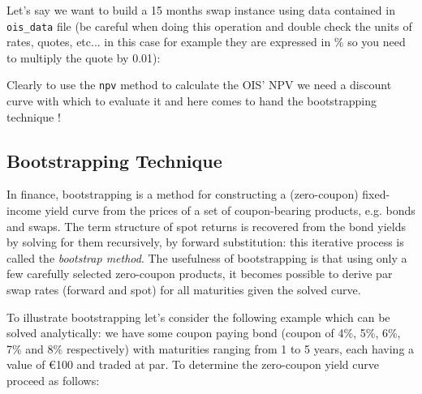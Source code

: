 Let's say we want to build a 15 months swap instance using data contained in \texttt{ois\_data} file (be careful when doing this operation and double check the units of rates, quotes, etc... in this case for example they are expressed in \% so you need to multiply the quote by 0.01):

\begin{Shaded}
\begin{Highlighting}[]
\OperatorTok{=}\NormalTok{,}
\NormalTok{                         [date(}\NormalTok{, }\NormalTok{, }\NormalTok{), }
\NormalTok{, }\NormalTok{, }\NormalTok{), }
\NormalTok{, }\NormalTok{, }\NormalTok{)],                        }
\NormalTok{                         market_quotes[}\NormalTok{]}\OperatorTok{*} 
\NormalTok{                        )}
\NormalTok{ois.payment_dates[}\OperatorTok{-}\NormalTok{]}
\end{Highlighting}
\end{Shaded}

Clearly to use the \texttt{npv} method to calculate the OIS' NPV we need a discount curve with which to evaluate it and here comes to hand the bootstrapping technique !

\subsection{Bootstrapping Technique}\label{the-bootstrapping-technique}

In finance, bootstrapping is a method for constructing a (zero-coupon) fixed-income yield curve from the prices of a set of coupon-bearing products, e.g. bonds and swaps.
The term structure of spot returns is recovered from the bond yields by solving for them recursively, by forward substitution: this iterative process is called the \emph{bootstrap method}.
The usefulness of bootstrapping is that using only a few carefully selected zero-coupon products, it becomes possible to derive par swap rates (forward and spot) for all maturities given the solved curve.

To illustrate bootstrapping let's consider the following example which can be solved analytically: we have some coupon paying bond (coupon of 4\%, 5\%, 6\%, 7\% and 8\% respectively) with maturities ranging from 1 to 5 years, each having a value of \euro{100} and traded at par. To determine the zero-coupon yield curve proceed as follows:

